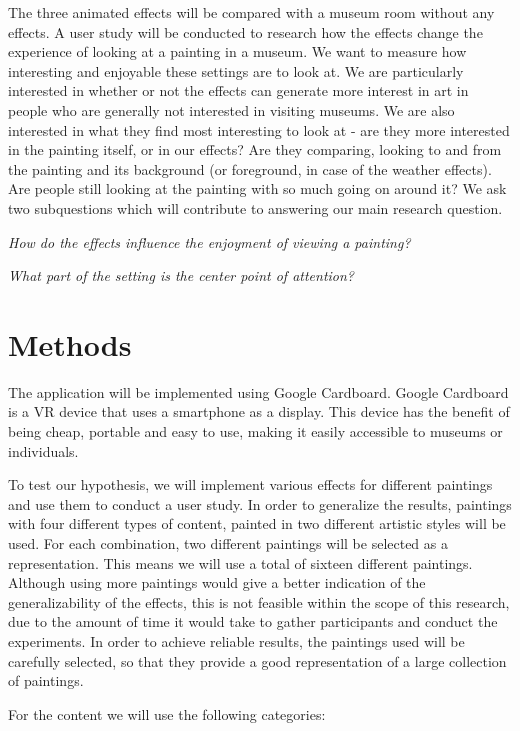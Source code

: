 \documentclass[a4paper]{article}
\begin{document}
The three animated effects will be compared with a museum room without any effects. A user study will be conducted to research how the effects change the experience of looking at a painting in a museum. 
We want to measure how interesting and enjoyable these settings are to look at. We are particularly interested in whether or not the effects can generate more interest in art in people who are generally not interested in visiting museums.
We are also interested in what they find most interesting to look at - are they more interested in the painting itself, or in our effects? Are they comparing, looking to and from the painting and its background (or foreground, in case of the weather effects). Are people still looking at the painting with so much going on around it? We ask two subquestions which will contribute to answering our main research question.

\emph{How do the effects influence the enjoyment of viewing a painting?}

\emph{What part of the setting is the center point of attention?}

\section{Methods} \label{sec:methods}

The application will be implemented using Google Cardboard. Google Cardboard is a VR device that uses a smartphone as a display. This device has the benefit of being cheap, portable and easy to use, making it easily accessible to museums or individuals.

To test our hypothesis, we will implement various effects for different paintings and use them to conduct a user study. In order to generalize the results, paintings with four different types of content, painted in two different artistic styles will be used. For each combination, two different paintings will be selected as a representation. This means we will use a total of sixteen different paintings. Although using more paintings would give a better indication of the generalizability of the effects, this is not feasible within the scope of this research, due to the amount of time it would take to gather participants and conduct the experiments. In order to achieve reliable results, the paintings used will be carefully selected, so that they provide a good representation of a large collection of paintings.

For the content we will use the following categories:
\end{document}

